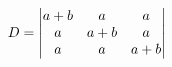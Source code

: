 \documentclass[preview]{standalone}
\begin{document}
\begin{align*}
\special{dvisvgm:raw <g id='unique000'>}D=\begin{vmatrix}a+b&a&a\\a&a+b&a\\a&a&a+b\end{vmatrix}\special{dvisvgm:raw </g>}
\end{align*}
\end{document}
